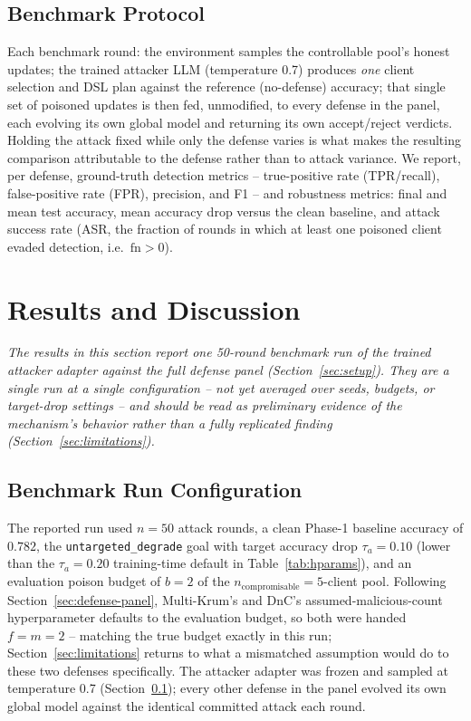 \documentclass[conference]{IEEEtran}
\begin{document}
\subsection{Benchmark Protocol}
\label{sec:benchmark-protocol}
Each benchmark round: the environment samples the controllable pool's honest updates; the trained attacker LLM (temperature 0.7) produces \emph{one} client selection and DSL plan against the reference (no-defense) accuracy; that single set of poisoned updates is then fed, unmodified, to every defense in the panel, each evolving its own global model and returning its own accept/reject verdicts. Holding the attack fixed while only the defense varies is what makes the resulting comparison attributable to the defense rather than to attack variance. We report, per defense, ground-truth detection metrics -- true-positive rate (TPR/recall), false-positive rate (FPR), precision, and F1 -- and robustness metrics: final and mean test accuracy, mean accuracy drop versus the clean baseline, and attack success rate (ASR, the fraction of rounds in which at least one poisoned client evaded detection, i.e.\ $\mathrm{fn}>0$).

\section{Results and Discussion}
\label{sec:results}

\textit{The results in this section report one 50-round benchmark run of the trained attacker adapter against the full defense panel (Section~\ref{sec:setup}). They are a single run at a single configuration -- not yet averaged over seeds, budgets, or target-drop settings -- and should be read as preliminary evidence of the mechanism's behavior rather than a fully replicated finding (Section~\ref{sec:limitations}).}

\subsection{Benchmark Run Configuration}
\label{sec:run-config}
The reported run used $n=50$ attack rounds, a clean Phase-1 baseline accuracy of $0.782$, the \texttt{untargeted\_degrade} goal with target accuracy drop $\tau_a = 0.10$ (lower than the $\tau_a=0.20$ training-time default in Table~\ref{tab:hparams}), and an evaluation poison budget of $b=2$ of the $n_{\mathrm{compromisable}}=5$-client pool. Following Section~\ref{sec:defense-panel}, Multi-Krum's and DnC's assumed-malicious-count hyperparameter defaults to the evaluation budget, so both were handed $f=m=2$ -- matching the true budget exactly in this run; Section~\ref{sec:limitations} returns to what a mismatched assumption would do to these two defenses specifically. The attacker adapter was frozen and sampled at temperature 0.7 (Section~\ref{sec:benchmark-protocol}); every other defense in the panel evolved its own global model against the identical committed attack each round.
\end{document}
